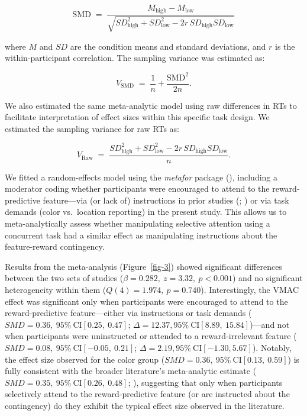 \documentclass[
  man,
  floatsintext,
  longtable,
  nolmodern,
  notxfonts,
  notimes,
  mask,
  colorlinks=true,linkcolor=blue,citecolor=blue,urlcolor=blue]{apa7}
\begin{document}
\[
\mathrm{SMD} \;=\; \frac{M_{\text{high}} - M_{\text{low}}}{\sqrt{SD_{\text{high}}^{2} + SD_{\text{low}}^{2} - 2r\,SD_{\text{high}}SD_{\text{low}}}}
\]

where \(M\) and \(SD\) are the condition means and standard deviations,
and \(r\) is the within-participant correlation. The sampling variance
was estimated as:

\[
V_{\mathrm{SMD}} \;=\; \frac{1}{n} + \frac{\mathrm{SMD}^{2}}{2n}.
\]

We also estimated the same meta-analytic model using raw differences in
RTs to facilitate interpretation of effect sizes within this specific
task design. We estimated the sampling variance for raw RTs as:

\[
V_{\mathrm{Raw}} \;=\; \frac{SD_{\text{high}}^{2} + SD_{\text{low}}^{2} - 2r\,SD_{\text{high}}SD_{\text{low}}}{n}.
\]

We fitted a random-effects model using the \emph{metafor} package
(), including a moderator
coding whether participants were encouraged to attend to the
reward-predictive feature---via (or lack of) instructions in prior
studies (;
)
or via task demands (color vs.~location reporting) in the present study.
This allows us to meta-analytically assess whether manipulating
selective attention using a concurrent task had a similar effect as
manipulating instructions about the feature-reward contingency.

Results from the meta-analysis (Figure~\ref{fig-3}) showed significant
differences between the two sets of studies
(\(\beta = 0.282,\ z = 3.32,\ p < 0.001\)) and no significant
heterogeneity within them (\(Q(4) = 1.974,\ p = 0.740\)). Interestingly,
the VMAC effect was significant only when participants were encouraged
to attend to the reward-predictive feature---either via instructions or
task demands (\(\mathit{SMD}=0.36, \ 95\% \ \text{CI} [0.25, \ 0.47]\);
\(\Delta = 12.37, 95\% \ \text{CI} [8.89, \ 15.84]\))---and not when
participants were uninstructed or attended to a reward-irrelevant
feature (\(\mathit{SMD}=0.08, \ 95\% \ \text{CI} [-0.05, \ 0.21]\);
\(\Delta = 2.19, 95\% \ \text{CI} [-1.30,5.67]\)). Notably, the effect
size observed for the color group
(\(\mathit{SMD}=0.36, \ 95\% \ \text{CI}[0.13, \ 0.59]\)) is fully
consistent with the broader literature's meta-analytic estimate
(\(\mathit{SMD}=0.35, \ 95\% \  \text{CI} [0.26, \ 0.48]\);
), suggesting that only when
participants selectively attend to the reward-predictive feature (or are
instructed about the contingency) do they exhibit the typical effect
size observed in the literature.
\end{document}

